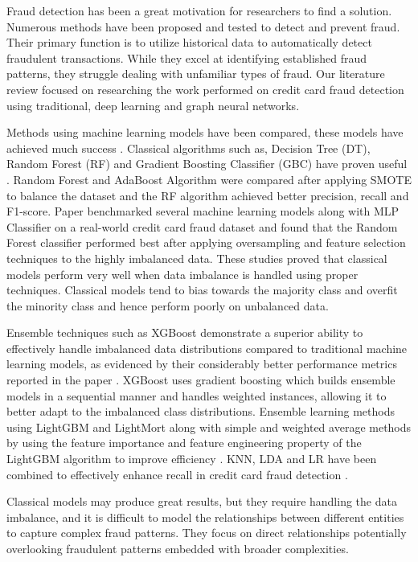 \documentclass[pdflatex,sn-mathphys-num]{sn-jnl}%
\begin{document}
Fraud detection has been a great motivation for researchers to find a solution. Numerous methods have been proposed and tested to detect and prevent fraud. Their primary function is to utilize historical data to automatically detect fraudulent transactions. While they excel at identifying established fraud patterns, they struggle dealing with unfamiliar types of fraud. Our literature review focused on researching the work performed on credit card fraud detection using traditional, deep learning and graph neural networks.

Methods using machine learning models have been compared, these models have achieved much success \cite{awoyemi2017}. Classical algorithms such as, Decision Tree (DT), Random Forest (RF) and Gradient Boosting Classifier (GBC) have proven useful \cite{mohbey2022}. Random Forest and AdaBoost Algorithm were compared \cite{sailusha2020} after applying SMOTE to balance the dataset and the RF algorithm achieved better precision, recall and F1-score. Paper \cite{varmedja2019} benchmarked several machine learning models along with MLP Classifier on a real-world credit card fraud dataset and found that the Random Forest classifier performed best after applying oversampling and feature selection techniques to the highly imbalanced data. These studies proved that classical models perform very well when data imbalance is handled using proper techniques. Classical models tend to bias towards the majority class and overfit the minority class and hence perform poorly on unbalanced data. 

Ensemble techniques such as XGBoost demonstrate a superior ability to effectively handle imbalanced data distributions compared to traditional machine learning models, as evidenced by their considerably better performance metrics reported in the paper \cite{mohbey2022}. XGBoost uses gradient boosting which builds ensemble models in a sequential manner and handles weighted instances, allowing it to better adapt to the imbalanced class distributions. Ensemble learning methods using LightGBM and LightMort along with simple and weighted average methods by using the feature importance and feature engineering property of the LightGBM algorithm to improve efficiency \cite{bakhtiari2023}. KNN, LDA and LR have been combined to effectively enhance recall in credit card fraud detection \cite{chung2023}.


Classical models may produce great results, but they require handling the data imbalance, and it is difficult to model the relationships between different entities to capture complex fraud patterns. They focus on direct relationships potentially overlooking fraudulent patterns embedded with broader complexities.
\end{document}
